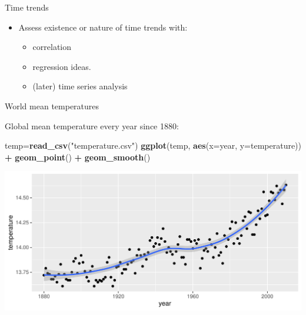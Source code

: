 \documentclass[ignorenonframetext,]{beamer}
\newenvironment{Shaded}{\begin{snugshade}}{\end{snugshade}}
\newcommand{\DataTypeTok}[1]{\textcolor[rgb]{0.13,0.29,0.53}{#1}}
\newcommand{\KeywordTok}[1]{\textcolor[rgb]{0.13,0.29,0.53}{\textbf{#1}}}
\newcommand{\NormalTok}[1]{#1}
\newcommand{\OperatorTok}[1]{\textcolor[rgb]{0.81,0.36,0.00}{\textbf{#1}}}
\newcommand{\StringTok}[1]{\textcolor[rgb]{0.31,0.60,0.02}{#1}}
\providecommand{\tightlist}{%
  \setlength{\itemsep}{0pt}\setlength{\parskip}{0pt}}
\begin{document}
\begin{frame}{Time trends}
\protect\hypertarget{time-trends}{}

\begin{itemize}
\tightlist
\item
  Assess existence or nature of time trends with:

  \begin{itemize}
  \tightlist
  \item
    correlation
  \item
    regression ideas.
  \item
    (later) time series analysis
  \end{itemize}
\end{itemize}

\end{frame}

\begin{frame}[fragile]{World mean temperatures}
\protect\hypertarget{world-mean-temperatures}{}

Global mean temperature every year since 1880:

\small

\begin{Shaded}
\begin{Highlighting}[]
\NormalTok{temp=}\KeywordTok{read_csv}\NormalTok{(}\StringTok{"temperature.csv"}\NormalTok{)}
\KeywordTok{ggplot}\NormalTok{(temp, }\KeywordTok{aes}\NormalTok{(}\DataTypeTok{x=}\NormalTok{year, }\DataTypeTok{y=}\NormalTok{temperature)) }\OperatorTok{+}\StringTok{ }
\StringTok{  }\KeywordTok{geom_point}\NormalTok{() }\OperatorTok{+}\StringTok{ }\KeywordTok{geom_smooth}\NormalTok{()}
\end{Highlighting}
\end{Shaded}

\includegraphics{figure/unnamed-chunk-557-1.pdf} \normalsize

\end{frame}
\end{document}
